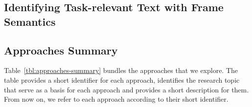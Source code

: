 \subsection{Identifying Task-relevant Text with Frame Semantics}













\subsection{Approaches Summary}


Table~\ref{tbl:approaches-summary} bundles the approaches that we explore.
The table provides a short identifier for each approach, identifies the research topic that serve as a basis for each approach and provides a short description for them. From now on, we refer to each approach according to their short identifier.



